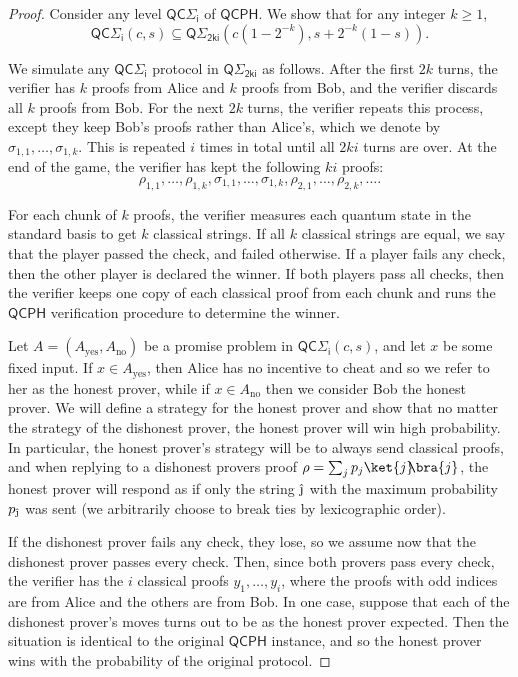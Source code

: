 \documentclass[11pt]{article}
\theoremstyle{definition}
\newcommand{\yes}{\text{yes}}
\newcommand{\no}{\text{no}}
\newcommand{\class}[1]{\ensuremath{\mathsf{#1}}\xspace}
\newcommand{\QCPH}{\class{QCPH}}
\newcommand{\QCSigmai}[1][i]{\class{QC\Sigma_{#1}}}
\newcommand{\QSigmai}[1][i]{\class{Q\Sigma_{#1}}}
\begin{document}
\begin{proof}
    Consider any level $\QCSigmai$ of $\QCPH$. 
    We show that for any integer $k\geq 1$, 
    \begin{equation}\label{eqn:QCinQPH}
        \QCSigmai(c,s) \subseteq \QSigmai[2ki]\left(c\left(1-2^{-k}\right),s + 2^{-k}\left(1 - s\right)\right).
    \end{equation} 

    We simulate any $\QCSigmai$ protocol in $\QSigmai[2ki]$ as follows. 
    After the first $2k$ turns, the verifier has $k$ proofs from Alice and $k$ proofs from Bob, and the verifier discards all $k$ proofs from Bob.
    For the next $2k$ turns, the verifier repeats this process, except they keep Bob's proofs rather than Alice's, which we denote by $\sigma_{1,1},\dots, \sigma_{1,k}$.
    This is repeated $i$ times in total until all $2ki$ turns are over. At the end of the game, the verifier has kept the following $ki$ proofs:
    \[
    \rho_{1,1},\dots, \rho_{1,k}, \sigma_{1,1}, \dots, \sigma_{1,k}, \rho_{2,1},\dots, \rho_{2,k}, \dots .
    \]
    
    For each chunk of $k$ proofs, the verifier measures each quantum state in the standard basis to get $k$ classical strings. If all $k$ classical strings are equal, we say that the player passed the check, and failed otherwise.  
    If a player fails any check, then the other player is declared the winner.
    If both players pass all checks, then the verifier keeps one copy of each classical proof from each chunk and runs the $\QCPH$ verification procedure to determine the winner. 

    Let $A = (A_\yes, A_\no)$ be a promise problem in $\QCSigmai(c,s)$, and let $x$ be some fixed input. 
    If $x \in A_\yes$, then Alice has no incentive to cheat and so we refer to her as the honest prover, while if $x \in A_\no$ then we consider Bob the honest prover.
    We will define a strategy for the honest prover and show that no matter the strategy of the dishonest prover, the honest prover will win high probability. 
    In particular, the honest prover's strategy will be to always send classical proofs, and when replying to a dishonest provers proof $\rho = \sum_j p_j \ket{j}\!\!\bra{j}$, the honest prover will respond as if only the string $\hat{\text{\j}}$ with the maximum probability $p_{\hat{\text{\j}}}$ was sent (we arbitrarily choose to break ties by lexicographic order).


    If the dishonest prover fails any check, they lose, so we assume now that the dishonest prover passes every check.
    Then, since both provers pass every check, the verifier has the $i$ classical proofs $y_1, \dots, y_i$, where the proofs with odd indices are from Alice and the others are from Bob. 
    In one case, suppose that each of the dishonest prover's moves turns out to be as the honest prover expected. 
    Then the situation is identical to the original $\QCPH$ instance, and so the honest prover wins with the probability of the original protocol. 
    

\end{proof}
\end{document}
